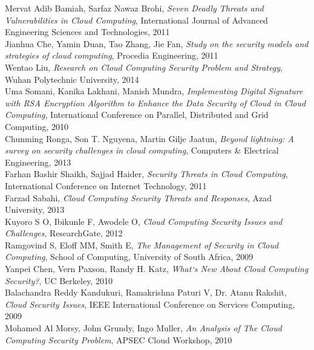 \documentclass[a4paper, 8pt]{article} %
\begin{document}
\begin{thebibliography}{1}
Mervat Adib Bamiah, Sarfaz Nawaz Brohi, \emph{Seven Deadly Threats and Vulnerabilities in Cloud Computing}, \relax International Journal of Advanced Engineering Sciences and Technologies, 2011\\
Jianhua Che, Yamin Duan, Tao Zhang, Jie Fan, \emph{Study on the security models and strategies of cloud computing}, \relax Procedia Engineering, 2011\\
Wentao Liu, \emph{Research on Cloud Computing Security Problem and Strategy}, \relax Wuhan Polytechnic University, 2014\\
Uma Somani, Kanika Lakhani, Manish Mundra, \emph{Implementing Digital Signature with RSA Encryption Algorithm to Enhance the Data Security of Cloud in Cloud Computing}, \relax International Conference on Parallel, Distributed and Grid Computing, 2010\\
Chunming Ronga, Son T. Nguyena, Martin Gilje Jaatun, \emph{Beyond lightning: A survey on security challenges in cloud computing}, \relax Computers \& Electrical Engineering, 2013\\
Farhan Bashir Shaikh, Sajjad Haider, \emph{Security Threats in Cloud Computing}, \relax International Conference on Internet Technology, 2011\\
Farzad Sabahi, \emph{Cloud Computing Security Threats and Responses}, \relax Azad University, 2013\\
Kuyoro S O, Ibikunle F, Awodele O, \emph{Cloud Computing Security Issues and Challenges}, \relax ResearchGate, 2012\\
Ramgovind S, Eloff MM, Smith E, \emph{The Management of Security in Cloud Computing}, \relax School of Computing, University of South Africa, 2009\\
Yanpei Chen, Vern Paxson, Randy H. Katz, \emph{What`s New About Cloud Computing Security?}, \relax UC Berkeley, 2010\\
Balachandra Reddy Kandukuri, Ramakrishna Paturi V, Dr. Atanu Rakshit, \emph{Cloud Security Issues}, \relax IEEE International Conference on Services Computing, 2009\\
Mohamed Al Morsy, John Grundy, Ingo Muller, \emph{An Analysis of The Cloud Computing Security Problem}, \relax APSEC Cloud Workshop, 2010\\

\end{thebibliography}
\end{document}
